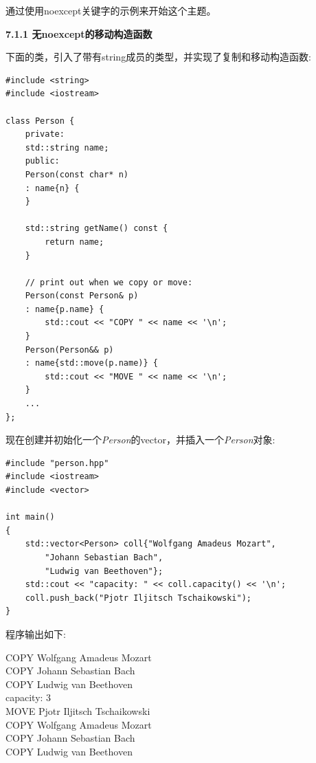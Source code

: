 通过使用noexcept关键字的示例来开始这个主题。\par

\hspace*{\fill} \par %
\textbf{7.1.1 无noexcept的移动构造函数}

下面的类，引入了带有string成员的类型，并实现了复制和移动构造函数:\par

{\color{red}{basics/person.hpp}}\par

\begin{lstlisting}[caption={}]
#include <string>
#include <iostream>

class Person {
	private:
	std::string name;
	public:
	Person(const char* n)
	: name{n} {
	}

	std::string getName() const {
		return name;
	}

	// print out when we copy or move:
	Person(const Person& p)
	: name{p.name} {
		std::cout << "COPY " << name << '\n';
	}
	Person(Person&& p)
	: name{std::move(p.name)} {
		std::cout << "MOVE " << name << '\n';
	}
	...
};
\end{lstlisting}

现在创建并初始化一个\textit{Person}的vector，并插入一个\textit{Person}对象:\par

{\color{red}{basics/person.cpp}}\par

\begin{lstlisting}[caption={}]
#include "person.hpp"
#include <iostream>
#include <vector>

int main()
{
	std::vector<Person> coll{"Wolfgang Amadeus Mozart",
		"Johann Sebastian Bach",
		"Ludwig van Beethoven"};
	std::cout << "capacity: " << coll.capacity() << '\n';
	coll.push_back("Pjotr Iljitsch Tschaikowski");
}
\end{lstlisting}

程序输出如下:\par

\begin{tcolorbox}[colback=white,colframe=black]
COPY Wolfgang Amadeus Mozart \\
COPY Johann Sebastian Bach \\
COPY Ludwig van Beethoven \\
capacity: 3 \\
MOVE Pjotr Iljitsch Tschaikowski \\
COPY Wolfgang Amadeus Mozart \\
COPY Johann Sebastian Bach \\
COPY Ludwig van Beethoven
\end{tcolorbox}

